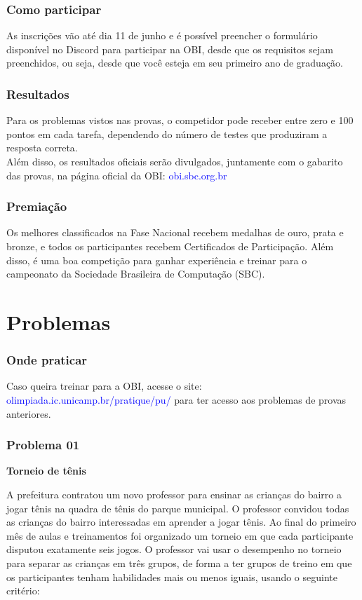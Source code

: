 \documentclass{beamer}
\begin{document}
\begin{frame}
\frametitle{Como participar}

As inscrições vão até dia 11 de junho e é possível preencher o formulário disponível no Discord para participar na OBI, desde que os requisitos sejam preenchidos, ou seja, desde que você esteja em seu primeiro ano de graduação.

\end{frame}

\begin{frame}
\frametitle{Resultados}
Para os problemas vistos nas provas, o competidor pode receber entre zero e 100 pontos em cada tarefa, dependendo do número de testes que produziram a resposta correta.\\
\vspace{0.6cm}
Além disso, os resultados oficiais serão divulgados, juntamente com o gabarito das provas, na página oficial da OBI: \textcolor{blue}{obi.sbc.org.br}
\end{frame}

\begin{frame}
\frametitle{Premiação}

Os melhores classificados na Fase Nacional recebem medalhas de ouro, prata e bronze, e todos os participantes recebem Certificados de Participação. Além disso, é uma boa competição para ganhar experiência e treinar para o campeonato da Sociedade Brasileira de Computação (SBC).

\end{frame}

\section{Problemas}

\begin{frame}
\frametitle{Onde praticar}

Caso queira treinar para a OBI, acesse o site: \textcolor{blue}{olimpiada.ic.unicamp.br/pratique/pu/} para ter acesso aos problemas de provas anteriores.
    
\end{frame}

\begin{frame}
\frametitle{Problema 01}

\textbf{Torneio de tênis}\vspace{0.2cm}

A prefeitura contratou um novo professor para ensinar as crianças do bairro a jogar tênis na quadra de tênis do parque municipal. O professor convidou todas as crianças do bairro interessadas em aprender a jogar tênis. Ao final do primeiro mês de aulas e treinamentos foi organizado um torneio em que cada participante disputou exatamente seis jogos. O professor vai usar o desempenho no torneio para separar as crianças em três grupos, de forma a ter grupos de treino em que os participantes tenham habilidades mais ou menos iguais, usando o seguinte critério: 

\end{frame}
\end{document}

